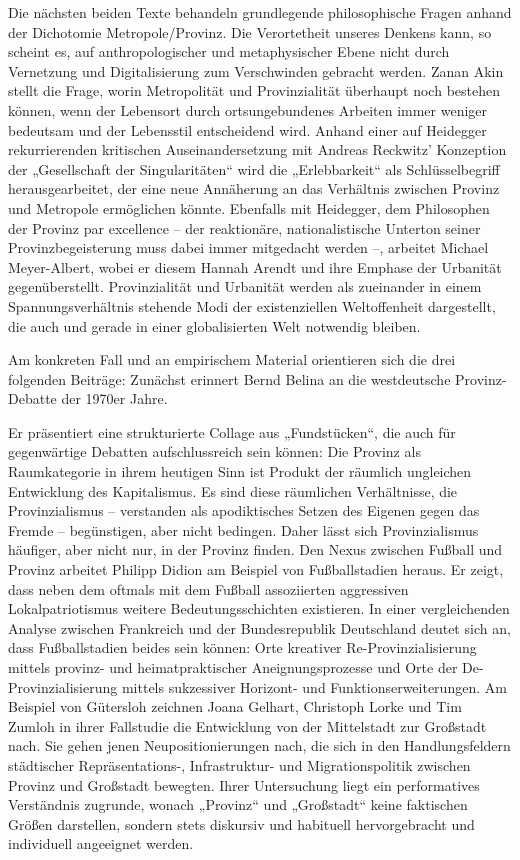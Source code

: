 \begin{multicols*}{2}
Die nächsten beiden Texte behandeln grundlegende philosophische Fragen anhand der Dichotomie Metropole/Provinz. Die Verortetheit unseres Denkens kann, so scheint es, auf anthropologischer und metaphysischer Ebene nicht durch Vernetzung und Digitalisierung zum Verschwinden gebracht werden. Zanan Akin stellt die Frage, worin Metropolität und Provinzialität überhaupt noch bestehen können, wenn der Lebensort durch ortsungebundenes Arbeiten immer weniger bedeutsam und der Lebensstil entscheidend wird. Anhand einer auf Heidegger rekurrierenden kritischen Auseinandersetzung mit Andreas Reckwitz’ Konzeption der „Gesellschaft der Singularitäten“ wird die „Erlebbarkeit“ als Schlüsselbegriff herausgearbeitet, der eine neue Annäherung an das Verhältnis zwischen Provinz und Metropole ermöglichen könnte. Ebenfalls mit Heidegger, dem Philosophen der Provinz par excellence – der reaktionäre, nationalistische Unterton seiner Provinzbegeisterung muss dabei immer mitgedacht werden –, arbeitet Michael Meyer-Albert, wobei er diesem Hannah Arendt und ihre Emphase der Urbanität gegenüberstellt. Provinzialität und Urbanität werden als zueinander in einem Spannungsverhältnis stehende Modi der existenziellen Weltoffenheit dargestellt, die auch und gerade in einer globalisierten Welt notwendig bleiben.

Am konkreten Fall und an empirischem Material orientieren sich die drei folgenden Beiträge: Zunächst erinnert Bernd Belina an die westdeutsche Provinz-Debatte der 1970er Jahre. 

Er präsentiert eine strukturierte Collage aus „Fundstücken“, die auch für gegenwärtige Debatten aufschlussreich sein können: Die Provinz als Raumkategorie in ihrem heutigen Sinn ist Produkt der räumlich ungleichen Entwicklung des Kapitalismus. Es sind diese räumlichen Verhältnisse, die Provinzialismus – verstanden als apodiktisches Setzen des Eigenen gegen das Fremde – begünstigen, aber nicht bedingen. Daher lässt sich Provinzialismus häufiger, aber nicht nur, in der Provinz finden. Den Nexus zwischen Fußball und Provinz arbeitet Philipp Didion am Beispiel von Fußballstadien heraus. Er zeigt, dass neben dem oftmals mit dem Fußball assoziierten aggressiven Lokalpatriotismus weitere Bedeutungsschichten existieren. In einer vergleichenden Analyse zwischen Frankreich und der Bundesrepublik Deutschland deutet sich an, dass Fußballstadien beides sein können: Orte kreativer Re-Provinzialisierung mittels provinz- und heimatpraktischer Aneignungsprozesse und Orte der De-Provinzialisierung mittels sukzessiver Horizont- und Funktionserweiterungen. Am Beispiel von Gütersloh zeichnen Joana Gelhart, Christoph Lorke und Tim Zumloh in ihrer Fallstudie die Entwicklung von der Mittelstadt zur Großstadt nach. Sie gehen jenen Neupositionierungen nach, die sich in den Handlungsfeldern städtischer Repräsentations-, Infrastruktur- und Migrationspolitik zwischen Provinz und Großstadt bewegten. Ihrer Untersuchung liegt ein performatives Verständnis zugrunde, wonach „Provinz“ und „Großstadt“ keine faktischen Größen darstellen, sondern stets diskursiv und habituell hervorgebracht und individuell angeeignet werden.


\end{multicols*}
